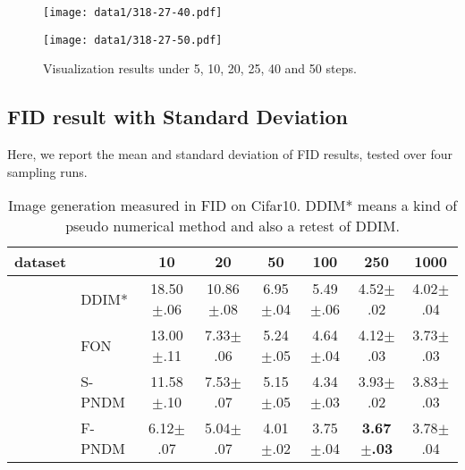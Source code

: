 \documentclass{article}
\begin{document}
\begin{figure}[!htbp]
\begin{minipage}[t]{0.329\linewidth}
   \end{minipage}
   \begin{minipage}[t]{0.329\linewidth}
      \centering
      \texttt{[image: data1/318-27-40.pdf]}   
   \end{minipage}
   \begin{minipage}[t]{0.329\linewidth}
      \centering
      \texttt{[image: data1/318-27-50.pdf]}   
   \end{minipage}
   \caption{Visualization results under 5, 10, 20, 25, 40 and 50 steps.}
   \label{fi_visualization}
\end{figure}

\subsection{FID result with Standard Deviation}
\label{sec_standard}

Here, we report the mean and standard deviation of FID results, tested over four sampling runs.

\begin{table}[!h]
   \centering
   \small
   \begin{tabular}{l |l |c c >{} c c c c }
      \toprule[1pt]
      dataset &  & 10 & 20 & 50 & 100 & 250 & 1000 \\
      \hline
            & DDIM*     & 18.50$\pm$.06 & 10.86$\pm$.08 & 6.95$\pm$.04 & 5.49$\pm$.06 & 4.52$\pm$.02 & 4.02$\pm$.04 \\
            & FON       & 13.00$\pm$.11 & 7.33$\pm$.06 & 5.24$\pm$.05 & 4.64$\pm$.04 & 4.12$\pm$.03 & 3.73$\pm$.03 \\
            & S-PNDM    & 11.58$\pm$.10 & 7.53$\pm$.07 & 5.15$\pm$.05 & 4.34$\pm$.03 & 3.93$\pm$.02 & 3.83$\pm$.03 \\
            & F-PNDM    & 6.12$\pm$.07 & 5.04$\pm$.07 & 4.01$\pm$.02 & 3.75$\pm$.04 & \textbf{3.67$\pm$.03} & 3.78$\pm$.04 \\
      \bottomrule[1pt]
   \end{tabular}
   \caption{Image generation measured in FID on Cifar10. DDIM* means a kind of pseudo numerical method and also a retest of DDIM.}
\end{table}
\end{document}
